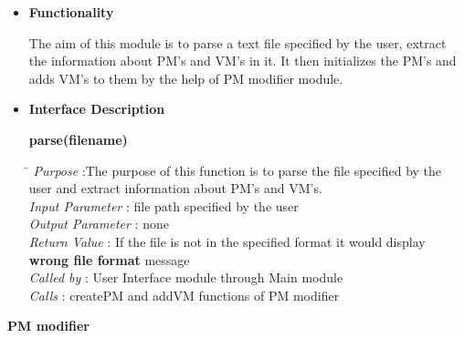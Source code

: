 \documentclass[a4paper,11pt]{article}
\begin{document}
\begin{itemize}
\item \textbf{Functionality}

The aim of this module is to parse a text file specified by the user, extract the information about PM's and VM's in it.
It then initializes the PM's and adds VM's to them by the help of PM modifier module.

\item \textbf{Interface Description}

\textbf{parse(filename)}
  
\begin{tabbing}
\hspace*{4cm}\= \kill
 \textit{Purpose} \> :The purpose of this function is to parse the file specified by the \\ \>user and extract information about PM's and VM's.\\
  \textit{Input Parameter} \> : file path specified by the user \\
  \textit{Output Parameter} \> : none \\
  \textit{Return Value} \> : If the file is not in the specified format it would display \\ \>\textbf{wrong file format} message \\
  \textit{Called by} \> : User Interface module through Main module \\
  \textit{Calls} \> : createPM and addVM functions of PM modifier\\
\end{tabbing}
\end{itemize}
\textbf{PM modifier}
\end{document}
